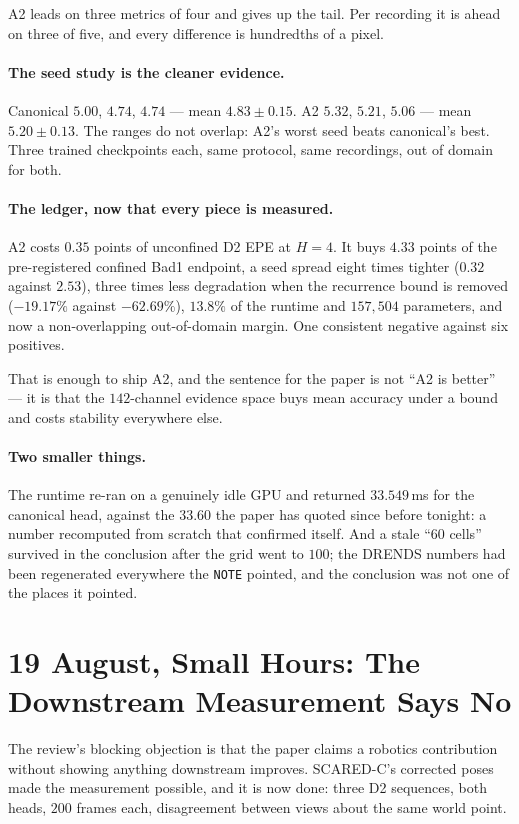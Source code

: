 \documentclass[11pt,a4paper]{article}
\begin{document}
A2 leads on three metrics of four and gives up the tail. Per recording it is
ahead on three of five, and every difference is hundredths of a pixel.

\paragraph{The seed study is the cleaner evidence.} Canonical $5.00$, $4.74$,
$4.74$ --- mean $4.83\pm0.15$. A2 $5.32$, $5.21$, $5.06$ --- mean
$5.20\pm0.13$. The ranges do not overlap: A2's worst seed beats canonical's
best. Three trained checkpoints each, same protocol, same recordings, out of
domain for both.

\paragraph{The ledger, now that every piece is measured.} A2 costs $0.35$ points
of unconfined D2 EPE at $H{=}4$. It buys $4.33$ points of the pre-registered
confined Bad1 endpoint, a seed spread eight times tighter ($0.32$ against
$2.53$), three times less degradation when the recurrence bound is removed
($-19.17\%$ against $-62.69\%$), $13.8\%$ of the runtime and $157{,}504$
parameters, and now a non-overlapping out-of-domain margin. One consistent
negative against six positives.

That is enough to ship A2, and the sentence for the paper is not ``A2 is
better'' --- it is that the $142$-channel evidence space buys mean accuracy under
a bound and costs stability everywhere else.

\paragraph{Two smaller things.} The runtime re-ran on a genuinely idle GPU and
returned $33.549$\,ms for the canonical head, against the $33.60$ the paper has
quoted since before tonight: a number recomputed from scratch that confirmed
itself. And a stale ``60 cells'' survived in the conclusion after the grid went
to $100$; the DRENDS numbers had been regenerated everywhere the
\texttt{NOTE} pointed, and the conclusion was not one of the places it pointed.


\section*{19 August, Small Hours: The Downstream Measurement Says No}

The review's blocking objection is that the paper claims a robotics contribution
without showing anything downstream improves. SCARED-C's corrected poses made the
measurement possible, and it is now done: three D2 sequences, both heads, $200$
frames each, disagreement between views about the same world point.
\end{document}
